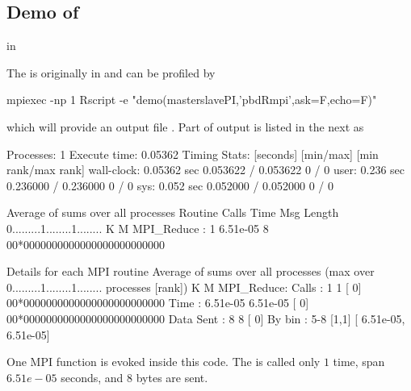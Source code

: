 \subsection{Demo of }

 in 


The  is originally in  and can be profiled
by
\begin{Code}
mpiexec -np 1 Rscript -e "demo(masterslavePI,'pbdRmpi',ask=F,echo=F)"
\end{Code}
which will provide an output file .
Part of output is listed in the next as
\begin{Output}
Processes:	1
Execute time:	0.05362
Timing Stats: [seconds]	[min/max]    	[min rank/max rank]
  wall-clock: 0.05362 sec	0.053622 / 0.053622	0 / 0
        user: 0.236 sec	0.236000 / 0.236000	0 / 0
         sys: 0.052 sec	0.052000 / 0.052000	0 / 0

                  Average of sums over all processes
Routine                 Calls       Time Msg Length    %
                                                    0.........1........1........
                                                              K        M
MPI_Reduce          :       1   6.51e-05          8 00*0000000000000000000000000

Details for each MPI routine
                  Average of sums over all processes
                                (max over          0.........1........1........
                                 processes [rank])           K        M
MPI_Reduce:
	Calls     :          1            1 [   0] 00*0000000000000000000000000
	Time      :   6.51e-05     6.51e-05 [   0] 00*0000000000000000000000000
	Data Sent :          8            8 [   0]
	By bin    : 5-8	[1,1]	[  6.51e-05,  6.51e-05]
\end{Output}
One MPI  function  is
evoked inside this  code. The  is called only $1$
time, span $6.51e-05$ seconds, and 8 bytes are sent.


